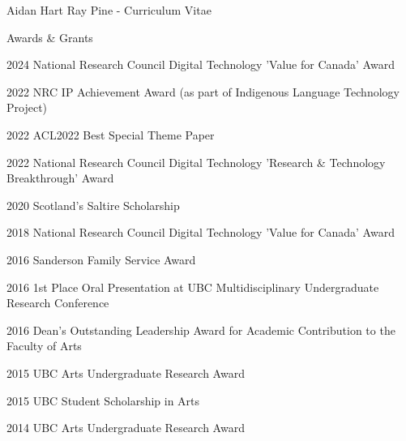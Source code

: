 \documentclass[12pt]{letter}
\begin{document}
\begin{cv}{ Aidan Hart Ray Pine  \space - \space   Curriculum Vitae}
        \begin{cvlist}{Awards \& Grants}
                        \item[2024] National Research Council Digital Technology 'Value for Canada' Award
                        \item[2022] NRC IP Achievement Award (as part of Indigenous Language Technology Project)
                        \item[2022] ACL2022 Best Special Theme Paper
                        \item[2022] National Research Council Digital Technology 'Research \& Technology Breakthrough' Award
                        \item[2020] Scotland's Saltire Scholarship
                        \item[2018] National Research Council Digital Technology 'Value for Canada' Award
                        \item[2016] Sanderson Family Service Award
                        \item[2016] 1st Place Oral Presentation at UBC Multidisciplinary Undergraduate Research Conference
                        \item[2016] Dean's Outstanding Leadership Award for Academic Contribution to the Faculty of Arts
                        \item[2015] UBC Arts Undergraduate Research Award
                        \item[2015] UBC Student Scholarship in Arts
                        \item[2014] UBC Arts Undergraduate Research Award
                    \end{cvlist}

    \end{cv}
    
    
\end{document}
